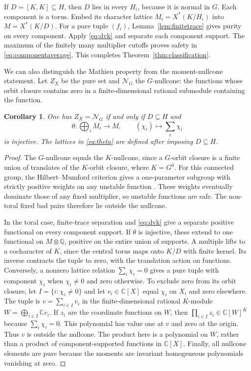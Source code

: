 \documentclass[11pt]{article}
\numberwithin{equation}{section}
\newtheorem{corollary}[theorem]{Corollary}
\theoremstyle{definition}
\theoremstyle{remark}
\newcommand{\C}{\mathbb C}
\newcommand{\Q}{\mathbb Q}
\begin{document}
If $D=[K,K]\subseteq H$, then $D$ lies in every $H_i$, because it is
normal in $G$. Each component is a torus. Embed its character lattice
$M_i=X^*(K/H_i)$ into $M=X^*(K/D)$. For a pure tuple $(f_i)$,
Lemma~\ref{lem:finitetrace} gives purity on every component.
Apply \eqref{eq:dvk} and separate each component support. The maximum
of the finitely many multiplier cutoffs proves safety in
\eqref{eq:componentaverage}. This completes
Theorem~\ref{thm:classification}.

We can also distinguish the Mathieu property from the moment-nullcone
statement. Let $Z_X$ be the pure set and $\mathcal N_G$ the $G$-nullcone:
the functions whose orbit closure contains zero in a finite-dimensional
rational submodule containing the function.

\begin{corollary}\label{cor:nullcone}
One has $Z_X=\mathcal N_G$ if and only if $D\subseteq H$ and
\begin{equation}\label{eq:theta}
 \theta:\bigoplus_i M_i\longrightarrow M,\qquad
 (\chi_i)\longmapsto\sum_i\chi_i
\end{equation}
is injective. The lattices in \eqref{eq:theta} are defined after imposing
$D\subseteq H$.
\end{corollary}
\begin{proof}
The $G$-nullcone equals the $K$-nullcone, since a $G$-orbit closure is
a finite union of translates of the $K$-orbit closure, where $K=G^0$.
For this connected group, the Hilbert--Mumford criterion gives a
one-parameter subgroup with strictly positive weights on any unstable
function \cite[Introduction and Section~2]{Kempf}. These weights
eventually dominate those of any fixed multiplier, so unstable
functions are safe. The non-toral fixed bad
pairs therefore lie outside the nullcone.

In the toral case, finite-trace separation and \eqref{eq:dvk} give a
separate positive functional on every component support. If $\theta$
is injective, these extend to one functional on $M\otimes\Q$, positive
on the entire union of supports. A multiple lifts to a cocharacter of
$K$, since the central torus maps onto $K/D$ with finite kernel. Its
inverse contracts the tuple to zero, with the translation action on
functions. Conversely, a nonzero lattice
relation $\sum_i\chi_i=0$ gives a pure tuple with component $\chi_i$
when $\chi_i\ne0$ and zero otherwise. To exclude zero from its orbit
closure, let $I=\{i:\chi_i\ne0\}$ and let $v_i\in\C[X]$ equal
$\chi_i$ on $X_i$ and zero elsewhere. The tuple is $v=\sum_{i\in I}v_i$
in the finite-dimensional rational $K$-module
$W=\bigoplus_{i\in I}\C v_i$. If $z_i$ are the coordinate functions
on $W$, then $\prod_{i\in I}z_i\in\C[W]^K$ because
$\sum_i\chi_i=0$. This polynomial has value one at $v$ and zero at
the origin. Thus $v$ is outside the nullcone. The product here is a
polynomial on $W$, rather than a product of component-supported
functions in $\C[X]$.
Finally, all nullcone elements are pure because the moments are invariant
homogeneous polynomials vanishing at zero.
\end{proof}
\end{document}

